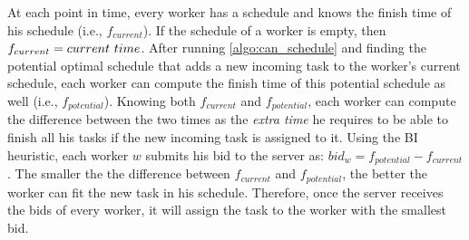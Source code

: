At each point in time, every worker has a schedule and knows the finish time of his schedule (i.e., $f_{current}$). If the schedule of a worker is empty, then $f_{current} = \mathnormal{current \ time}$. After running \cref{algo:can_schedule} and finding the potential optimal schedule that adds a new incoming task to the worker's current schedule, each worker can compute the finish time of this potential schedule as well (i.e., $f_{potential}$). Knowing both $f_{current}$ and $f_{potential}$, each worker can compute the difference between the two times as the \emph{extra time} he requires to be able to finish all his tasks if the new incoming task is assigned to it. Using the BI heuristic, each worker $w$ submits his bid to the server as: $ bid_w = f_{potential} - f_{current}$. The smaller the the difference between $f_{current}$ and $f_{potential}$, the better the worker can fit the new task in his schedule. Therefore, once the server receives the bids of every worker, it will assign the task to the worker with the smallest bid.